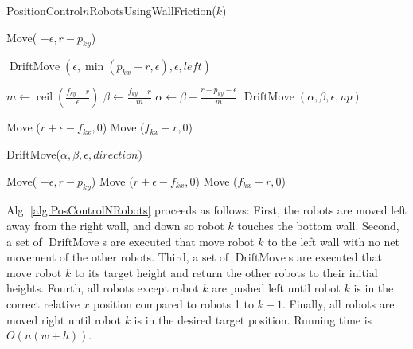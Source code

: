 \begin{algorithm}
\caption{PositionControl$n$RobotsUsingWallFriction($k$)}\label{alg:PosControlNRobots}
\begin{algorithmic}[1]
\State Move( $-\epsilon, r-p_{ky}$) %


\State $\operatorname{DriftMove}(\epsilon, \min(p_{kx} - r,\epsilon), \epsilon,left)$    %
\EndWhile

\State $m \gets \operatorname{ceil}(\frac{f_{ky}-r}{\epsilon})$
\State $\beta \gets \frac{f_{ky}-r}{m}$
\State $\alpha \gets \beta - \frac{r - p_{ky}-\epsilon}{m}$
\State $\operatorname{DriftMove}(\alpha, \beta, \epsilon,up)$    %
\EndFor

\State Move ($r+\epsilon-f_{kx}, 0$)  %
\State Move ($f_{kx}-r, 0$)  

\end{algorithmic}
\end{algorithm}


\begin{algorithm}
\caption{ {\sc DriftMove}($\alpha,\beta,\epsilon,direction$)}\label{alg:DriftMove}
\begin{algorithmic}[1]
\State Move( $-\epsilon, r-p_{ky}$) %
\State Move ($r+\epsilon-f_{kx}, 0$)  %
\State Move ($f_{kx}-r, 0$)  

\end{algorithmic}
\end{algorithm}


Alg. \ref{alg:PosControlNRobots} proceeds as follows:  
First, the robots are moved left away from the right wall, and down so robot $k$ touches the bottom wall.
Second, a set of $\operatorname{DriftMove}$s are executed that move robot $k$ to the left wall with no net movement of the other robots.
Third, a set of $\operatorname{DriftMove}$s are executed that  move robot $k$ to its target height and return the other robots to their initial heights. 
Fourth, all robots except robot $k$ are pushed left until robot $k$ is in the correct relative $x$ position compared to robots 1 to $k-1$.
Finally, all robots are moved right until robot $k$ is in the desired target position. Running time is $O(n(w+h))$.



